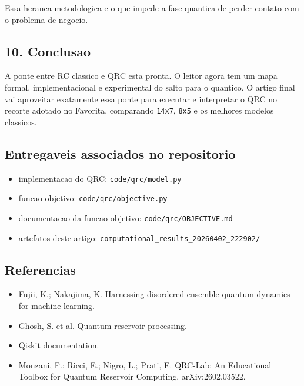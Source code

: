 \documentclass[12pt]{article}
\providecommand{\tightlist}{%
          \setlength{\itemsep}{0pt}\setlength{\parskip}{0pt}}
\begin{document}
Essa heranca metodologica e o que impede a fase quantica de perder contato com o problema de negocio.

\subsection{10. Conclusao}\label{10-conclusao}

A ponte entre RC classico e QRC esta pronta. O leitor agora tem um mapa formal, implementacional e experimental do salto para o quantico. O artigo final vai aproveitar exatamente essa ponte para executar e interpretar o QRC no recorte adotado no Favorita, comparando \texttt{14x7}, \texttt{8x5} e os melhores modelos classicos.

\subsection{Entregaveis associados no repositorio}\label{entregaveis-associados-no-repositorio}

\begin{itemize}
\tightlist
\item
  implementacao do QRC: \texttt{code/qrc/model.py}
\item
  funcao objetivo: \texttt{code/qrc/objective.py}
\item
  documentacao da funcao objetivo: \texttt{code/qrc/OBJECTIVE.md}
\item
  artefatos deste artigo: \texttt{computational\_results\_20260402\_222902/}
\end{itemize}

\subsection{Referencias}\label{referencias}

\begin{itemize}
\tightlist
\item
  Fujii, K.; Nakajima, K. Harnessing disordered-ensemble quantum dynamics for machine learning.
\item
  Ghosh, S. et al. Quantum reservoir processing.
\item
  Qiskit documentation.
\item
  Monzani, F.; Ricci, E.; Nigro, L.; Prati, E. QRC-Lab: An Educational Toolbox for Quantum Reservoir Computing. arXiv:2602.03522.
\end{itemize}

        
\end{document}
